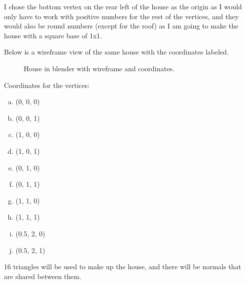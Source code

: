 \documentclass[10pt]{report}
\begin{document}
I chose the bottom vertex on the rear left of the house as the origin as I would only have to work with positive numbers for the rest of the vertices, and they would also be round numbers (except for the roof) as I am going to make the house with a square base of 1x1. 

Below is a wireframe view of the same house with the coordinates labeled.
\begin{figure}[H]
    \centering
    \caption{House in blender with wireframe and coordinates.}
\end{figure}

Coordinates for the vertices:
\begin{enumerate}[(a)]
    \item (0, 0, 0)
    \item (0, 0, 1)
    \item (1, 0, 0)
    \item (1, 0, 1)
    \item (0, 1, 0)
    \item (0, 1, 1)
    \item (1, 1, 0)
    \item (1, 1, 1)
    \item (0.5, 2, 0)
    \item (0.5, 2, 1)
\end{enumerate}

16 triangles will be used to make up the house, and there will be normals that are shared between them.


\end{document}
